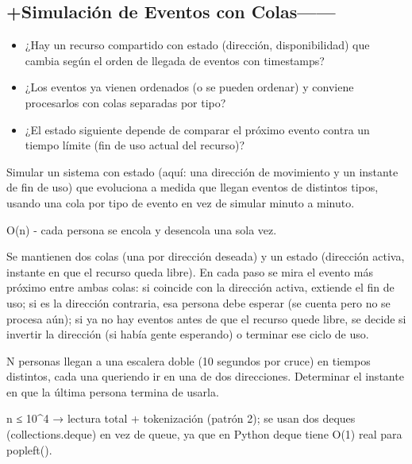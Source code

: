 \subsection{+Simulación de Eventos con Colas------}


\begin{itemize}
\item ¿Hay un recurso compartido con estado (dirección, disponibilidad) que cambia según el orden de llegada de eventos con timestamps?
\item ¿Los eventos ya vienen ordenados (o se pueden ordenar) y conviene procesarlos con colas separadas por tipo?
\item ¿El estado siguiente depende de comparar el próximo evento contra un tiempo límite (fin de uso actual del recurso)?
\end{itemize}

 Simular un sistema con estado (aquí: una dirección de movimiento y un instante de fin de uso) que evoluciona a medida que llegan eventos de distintos tipos, usando una cola por tipo de evento en vez de simular minuto a minuto.

 O(n) - cada persona se encola y desencola una sola vez.

 Se mantienen dos colas (una por dirección deseada) y un estado (dirección activa, instante en que el recurso queda libre). En cada paso se mira el evento más próximo entre ambas colas: si coincide con la dirección activa, extiende el fin de uso; si es la dirección contraria, esa persona debe esperar (se cuenta pero no se procesa aún); si ya no hay eventos antes de que el recurso quede libre, se decide si invertir la dirección (si había gente esperando) o terminar ese ciclo de uso.


N personas llegan a una escalera doble (10 segundos por cruce) en tiempos distintos, cada una queriendo ir en una de dos direcciones. Determinar el instante en que la última persona termina de usarla.

 n ≤ 10\textasciicircum{}4 → lectura total + tokenización (patrón 2); se usan dos deques (collections.deque) en vez de queue, ya que en Python deque tiene O(1) real para popleft().



